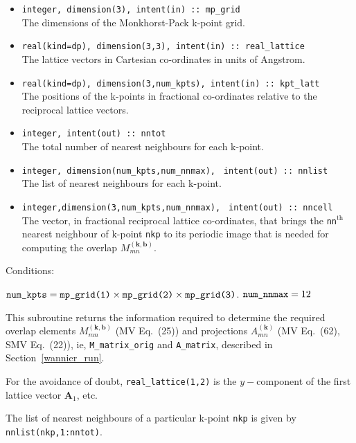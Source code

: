 \begin{itemize}
\item \verb#integer, dimension(3), intent(in) :: mp_grid#\\ The
  dimensions of the {Monkhorst-Pack} k-point grid.
\item \verb#real(kind=dp), dimension(3,3), intent(in) :: real_lattice#\\
  The lattice vectors in Cartesian co-ordinates in units of Angstrom.
\item
  \verb#real(kind=dp), dimension(3,num_kpts), intent(in) :: kpt_latt#\\
  The positions of the k-points in fractional co-ordinates
  relative to the reciprocal lattice vectors.
\item \verb#integer, intent(out) :: nntot#\\ The
  total number of nearest neighbours for each k-point. 
\item \verb#integer, dimension(num_kpts,num_nnmax),#
      \verb# intent(out) :: nnlist#\\
      The list of nearest neighbours for each k-point.
\item \verb#integer,dimension(3,num_kpts,num_nnmax),#
      \verb# intent(out) :: nncell#\\ 
      The vector, in fractional reciprocal lattice co-ordinates, that
      brings the \verb#nn#$^{\mathrm{th}}$ nearest neighbour of
      k-point \verb#nkp# to its periodic image that
      is needed for computing the overlap 
      $M_{mn}^{(\mathbf{k,b})}$.
\end{itemize}

Conditions:
\begin{itemize}
\cond $\verb#num_kpts# = \verb#mp_grid(1)# \times \verb#mp_grid(2)#
\times \verb#mp_grid(3)#$.
\cond $\verb#num_nnmax# = 12$
\end{itemize}

This subroutine returns the information required to determine the
required overlap elements $M_{mn}^{(\mathbf{k,b})}$ (MV Eq.~(25)) and
projections $A_{mn}^{(\mathbf{k})}$ (MV Eq.~(62), SMV Eq.~(22)),
ie, \verb#M_matrix_orig# and \verb#A_matrix#, described in
Section~\ref{wannier_run}.

For the avoidance of doubt, \verb#real_lattice(1,2)# is the
$y-$component of the first lattice vector $\mathbf{A}_{1}$, etc.

The list of nearest neighbours of a particular k-point \verb#nkp# is
given by \verb#nnlist(nkp,1:nntot)#.  

